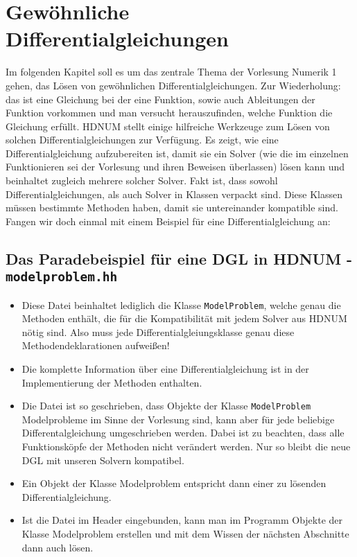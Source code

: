 \documentclass[a4paper,11pt]{article}
\theoremstyle{definition}
\begin{document}
\section{Gewöhnliche Differentialgleichungen}

Im folgenden Kapitel soll es um das zentrale Thema der Vorlesung
Numerik 1 gehen, das Lösen von gewöhnlichen Differentialgleichungen.
Zur Wiederholung: das ist eine Gleichung bei der eine Funktion, sowie
auch Ableitungen der Funktion vorkommen und man versucht
herauszufinden, welche Funktion die Gleichung erfüllt. HDNUM stellt
einige hilfreiche Werkzeuge zum Lösen von solchen
Differentialgleichungen zur Verfügung.  Es zeigt, wie eine
Differentialgleichung aufzubereiten ist, damit sie ein Solver (wie die
im einzelnen Funktionieren sei der Vorlesung und ihren Beweisen
überlassen) lösen kann und beinhaltet zugleich mehrere solcher
Solver. Fakt ist, dass sowohl Differentialgleichungen, als auch Solver
in Klassen verpackt sind. Diese Klassen müssen bestimmte Methoden
haben, damit sie untereinander kompatible sind. Fangen wir doch einmal
mit einem Beispiel für eine Differentialgleichung an:

\subsection{Das Paradebeispiel für eine DGL in HDNUM - \lstinline{modelproblem.hh}}

\begin{itemize}
\item Diese Datei beinhaltet lediglich die Klasse
  \lstinline{ModelProblem}, welche genau die Methoden enthält, die für
  die Kompatibilität mit jedem Solver aus HDNUM nötig sind. Also muss
  jede Differentialgleiungsklasse genau diese Methodendeklarationen
  aufweißen!
\item Die komplette Information über eine Differentialgleichung ist in
  der Implementierung der Methoden enthalten.
\item Die Datei ist so geschrieben, dass Objekte der Klasse
  \lstinline{ModelProblem} Modelprobleme im Sinne der Vorlesung sind,
  kann aber für jede beliebige Differentalgleichung umgeschrieben
  werden. Dabei ist zu beachten, dass alle Funktionsköpfe der Methoden
  nicht verändert werden. Nur so bleibt die neue DGL mit unseren
  Solvern kompatibel.
\item Ein Objekt der Klasse Modelproblem entspricht dann einer zu
  lösenden Differentialgleichung.
\item Ist die Datei im Header eingebunden, kann man im Programm
  Objekte der Klasse Modelproblem erstellen und mit dem Wissen der
  nächsten Abschnitte dann auch lösen.
\end{itemize}
\end{document}
